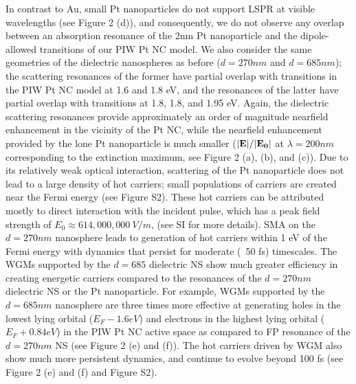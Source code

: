 \documentclass[journal=jpclcd,manuscript=article]{achemso}
\begin{document}
In contrast to Au, small Pt nanoparticles do not support LSPR at visible wavelengths (see Figure 2 (d)), and consequently, we do not
observe any overlap between an absorption resonance of the 2nm Pt nanoparticle and the dipole-allowed 
transitions of our PIW Pt NC model.  We also consider
the same geometries of the dielectric nanospheres as before ($d=270nm$ and $d=685 nm$); the scattering resonances of the former have partial overlap with transitions in the PIW Pt NC model at 1.6 and 1.8 eV, and the resonances of the latter have partial 
overlap with transitions at 1.8, 1.8, and 1.95 eV.  Again, the dielectric scattering resonances provide 
approximately an order of magnitude 
nearfield enhancement in the vicinity of the Pt NC, while the nearfield enhancement provided by the lone 
Pt nanoparticle is much smaller ($|{\bf E}|/|{\bf E_0}|$ at $\lambda=200nm$ corresponding to the extinction maximum, see Figure 2 (a), (b), and (c)).
Due to its relatively weak optical interaction, scattering of the Pt nanoparticle does not lead to a large density of hot carriers; small populations
of carriers are created near the Fermi energy (see Figure S2).  These hot carriers can be attributed mostly to direct interaction with the 
incident pulse, which has a peak field strength of $E_0 \approx 614,000,000 \: V/m$, (see SI for more details).
SMA on the $d=270nm$ nanosphere
leads to generation of hot carriers within 1 eV of the Fermi energy with dynamics that persist for moderate (~50 fs) timescales.
The WGMs supported by the $d=685$ dielectric NS show much greater efficiency in creating energetic carriers compared
to the resonances of the $d=270nm$ dielectric NS or the Pt nanoparticle.  For example, WGMs supported by the $d=685nm$ nanosphere are three times
more effective at generating holes in the lowest lying orbital ($E_F - 1.6 eV$) 
and electrons in the highest 
lying orbital ($E_F + 0.84 eV$) in the PIW Pt NC active space as compared to FP resonance of the $d=270nm$ NS (see Figure 2 (e) and (f)).  
The hot carriers driven by WGM also show much more persistent dynamics, and continue to evolve beyond 100 fs (see Figure 2 (e) and (f) and Figure S2).
\end{document}
